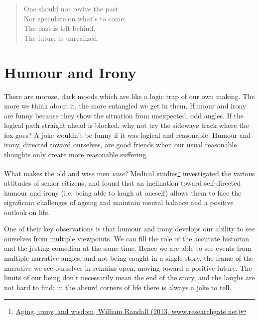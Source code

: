 \begin{quote}
One should not revive the past\\
Nor speculate on what's to come;\\
The past is left behind,\\
The future is unrealized.

\bigskip

\end{quote}

\section{Humour and Irony}


There are morose, dark moods which are like a logic trap of our own
making. The more we think about it, the more entangled we get in them.
Humour and irony are funny because they show the situation from
unexpected, odd angles. If the logical path straight ahead is blocked,
why not try the sideways track where the fox goes? A joke wouldn't be
funny if it was logical and reasonable. Humour and irony, directed
toward ourselves, are good friends when our usual reasonable thoughts
only create more reasonable suffering.

What makes the old and wise men \emph{wise}? Medical studies\footnote{\href{https://www.researchgate.net/publication/258190619_Aging_irony_and_wisdom_On_the_narrative_psychology_of_later_life}{Aging,
  irony, and wisdom, William Randall (2013, www.researchgate.net)}}
investigated the various attitudes of senior citizens, and found that an
inclination toward self-directed humour and irony (i.e. being able to
laugh at oneself) allows them to face the significant challenges of
ageing and maintain mental balance and a positive outlook on life.

One of their key observations is that humour and irony develops our
ability to see ourselves from multiple viewpoints. We can fill the role
of the accurate historian and the jesting comedian at the same time.
Hence we are able to see events from multiple narrative angles, and not
being caught in a single story, the frame of the narrative we see
ourselves in remains open, moving toward a positive future. The limits
of our being don't necessarily mean the end of the story, and the laughs
are not hard to find: in the absurd corners of life there is always a
joke to tell.

